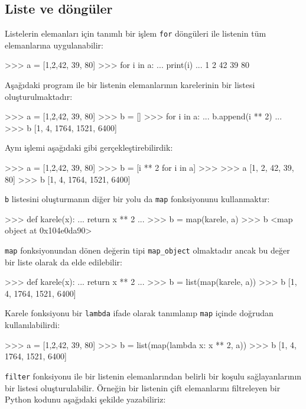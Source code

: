 \documentclass[12pt]{report}
\begin{document}
\subsection{Liste ve döngüler}

Listelerin elemanları için tanımlı bir işlem \texttt{for} döngüleri ile listenin tüm elemanlarına uygulanabilir:

\begin{python}
>>> a = [1,2,42, 39, 80]
>>> for i in a:
...     print(i)
... 
1
2
42
39
80
\end{python}


Aşağıdaki program ile bir listenin elemanlarının karelerinin bir listesi oluşturulmaktadır:

\begin{python}
>>> a = [1,2,42, 39, 80]
>>> b = []
>>> for i in a:
...     b.append(i ** 2)
... 
>>> b
[1, 4, 1764, 1521, 6400]
\end{python} 

Aynı işlemi aşağıdaki gibi gerçekleştirebilirdik:

\begin{python}
>>> a = [1,2,42, 39, 80]
>>> b = [i ** 2 for i in a]
>>> 
>>> a
[1, 2, 42, 39, 80]
>>> b
[1, 4, 1764, 1521, 6400]
\end{python}

\texttt{b} listesini oluşturmanın diğer bir yolu da \texttt{map} fonksiyonunu kullanmaktır:

\begin{python}
	>>> def karele(x): 
	...     return x ** 2
	... 
	>>> b = map(karele, a)
	>>> b
	<map object at 0x104e0da90>
\end{python}

\texttt{map} fonksiyonundan dönen değerin tipi \texttt{map\_object} olmaktadır ancak bu değer bir liste olarak da elde edilebilir:

\begin{python}
>>> def karele(x): 
...     return x ** 2
... 
>>> b = list(map(karele, a))
>>> b
[1, 4, 1764, 1521, 6400]
\end{python}

Karele fonksiyonu bir \texttt{lambda} ifade olarak tanımlanıp \texttt{map} içinde doğrudan kullanılabilirdi:

\begin{python}
>>> a = [1,2,42, 39, 80]
>>> b = list(map(lambda x: x ** 2, a))
>>> b
[1, 4, 1764, 1521, 6400]
\end{python}

\texttt{filter} fonksiyonu ile bir listenin elemanlarından belirli bir koşulu sağlayanlarının bir listesi oluşturulabilir. Örneğin bir listenin çift elemanlarını filtreleyen bir Python kodunu aşağıdaki şekilde yazabiliriz:
\end{document}
